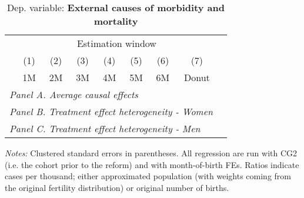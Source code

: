  \begin{table}[H] \begin{threeparttable} \centering \caption{Dep. variable: \textbf{External causes of morbidity and mortality}} {\def\sym#1{\ifmmode^{#1}\else\(^{#1}\)\fi} \begin{tabular}{l*{8}{c}} \toprule & \multicolumn{7}{c}{Estimation window} \\ \cmidrule(lr){2-8}
            &\multicolumn{1}{c}{(1)}&\multicolumn{1}{c}{(2)}&\multicolumn{1}{c}{(3)}&\multicolumn{1}{c}{(4)}&\multicolumn{1}{c}{(5)}&\multicolumn{1}{c}{(6)}&\multicolumn{1}{c}{(7)}\\
            &\multicolumn{1}{c}{1M}&\multicolumn{1}{c}{2M}&\multicolumn{1}{c}{3M}&\multicolumn{1}{c}{4M}&\multicolumn{1}{c}{5M}&\multicolumn{1}{c}{6M}&\multicolumn{1}{c}{Donut}\\
\midrule
 \multicolumn{8}{l}{\emph{Panel A. Average causal effects}} \\       \midrule\multicolumn{8}{l}{\emph{Panel B. Treatment effect heterogeneity - Women}} \\       \midrule\multicolumn{8}{l}{\emph{Panel C. Treatment effect heterogeneity - Men}} \\       
\bottomrule \end{tabular} } \begin{tablenotes} \item \scriptsize \emph{Notes:} Clustered standard errors in parentheses. All regression are run with CG2 (i.e. the cohort prior to the reform) and with month-of-birth FEs. Ratios indicate cases per thousand; either approximated population (with weights coming from the original fertility distribution) or original number of births. \end{tablenotes} \end{threeparttable} \end{table} 
